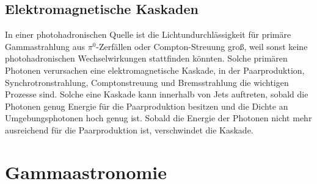 
\subsection{Elektromagnetische Kaskaden}
In einer photohadronischen Quelle ist die Lichtundurchlässigkeit für primäre Gammastrahlung aus $\pi^0$-Zerfällen oder Compton-Streuung groß, weil sonst keine photohadronischen Wechselwirkungen stattfinden könnten.
Solche primären Photonen verursachen eine elektromagnetische Kaskade, in der Paarproduktion, Synchrotronstrahlung, Comptonstreuung und Bremsstrahlung die wichtigen Prozesse sind.
Solche eine Kaskade kann innerhalb von Jets auftreten, sobald die Photonen genug Energie für die Paarproduktion besitzen und die Dichte an Umgebungsphotonen hoch genug ist.
Sobald die Energie der Photonen nicht mehr ausreichend für die Paarproduktion ist, verschwindet die Kaskade.\cite{RelativisticJets}


\section{Gammaastronomie}
\label{sec:Gammaastronomie}


